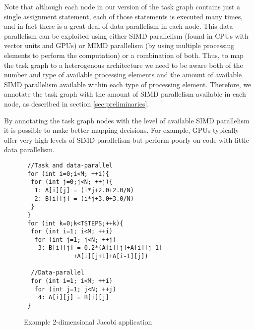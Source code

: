 Note that although each node in our version of the task graph contains
just a single assignment statement, each of those statements is executed
many times, and in fact there is a great deal of data parallelism in
each node. This data parallelism can be exploited using either SIMD
parallelism (found in CPUs with vector units and GPUs) or MIMD
parallelism (by using multiple processing elements to perform the
computation) or a combination of both. Thus, to map the task graph to a
heterogenous architecture we need to be aware both of the number and
type of available processing elements and the amount of available SIMD
parallelism available within each type of processing element. Therefore,
we annotate the task graph with the amount of SIMD parallelism available
in each node, as described in section \ref{sec:preliminaries}.

By annotating the task graph nodes with the level of available SIMD
parallelism it is possible to make better mapping decisions.  For
example, GPUs typically offer very high levels of SIMD parallelism but
perform poorly on code with little data parallelism.


\begin{scriptsize}
  \begin{figure}[h!]
    \centering
\begin{verbatim}
 //Task and data-parallel
 for (int i=0;i<M; ++i){
  for (int j=0;j<N; ++j){
   1: A[i][j] = (i*j+2.0+2.0/N)
   2: B[i][j] = (i*j+3.0+3.0/N)
  }
 }
 for (int k=0;k<TSTEPS;++k){
  for (int i=1; i<M; ++i)
   for (int j=1; j<N; ++j)
    3: B[i][j] = 0.2*(A[i][j]+A[i][j-1]
              +A[i][j+1]+A[i-1][j])

  //Data-parallel
  for (int i=1; i<M; ++i)
   for (int j=1; j<N; ++j)
    4: A[i][j] = B[i][j]
 }
\end{verbatim}
    \caption{Example 2-dimensional Jacobi application}
    \label{fig:2}
  \end{figure}
\end{scriptsize}




